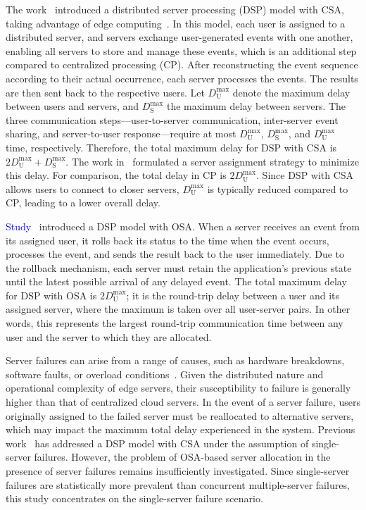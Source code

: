 \documentclass[10pt, letterpaper]{IEEEtran}
\newcommand\blue[1]{\textcolor{blue}{#1}}
\begin{document}
\begin{CJK}{UTF8}{ipxm}
The work~\cite{2Kawabata2017} introduced a distributed server processing (DSP) model with CSA, taking advantage of edge computing~\cite{edge_26,edge_27,edge_28,edge_29}. 
In this model, each user is assigned to a distributed server, and servers exchange user-generated events with one another, enabling all servers to store and manage these events, which is an additional step compared to centralized processing (CP). 
After reconstructing the event sequence according to their actual occurrence, each server processes the events.
The results are then sent back to the respective users. 
Let $D_\mathrm{U}^{\max}$ denote the maximum delay between users and servers, and $D_\mathrm{S}^{\max}$ the maximum delay between servers. 
The three communication steps—user-to-server communication, inter-server event sharing, and server-to-user response—require at most $D_\mathrm{U}^{\max}$, $D_\mathrm{S}^{\max}$, and $D_\mathrm{U}^{\max}$ time, respectively. 
Therefore, the total maximum delay for DSP with CSA is $2D_\mathrm{U}^{\max} + D_\mathrm{S}^{\max}$. 
The work in~\cite{2Kawabata2017} formulated a server assignment strategy to minimize this delay. 
For comparison, the total delay in CP is $2D_\mathrm{U}^{\max}$. 
Since DSP with CSA allows users to connect to closer servers, $D_\mathrm{U}^{\max}$ is typically reduced compared to CP, leading to a lower overall delay.

\blue{Study~\cite{OSA_Kawabata_2021,OSA_Kawabata_13_Kawabata2020}} introduced a DSP model with OSA.
When a server receives an event from its assigned user, it rolls back its status to the time when the event occurs, processes the event, and sends the result back to the user immediately.
Due to the rollback mechanism, each server must retain the application's previous state until the latest possible arrival of any delayed event.
The total maximum delay for DSP with OSA is $2D_\mathrm{U}^{\max}$;
it is the round-trip delay between a user and its assigned server, where the maximum is taken over all user-server pairs. 
In other words, this represents the largest round-trip communication time between any user and the server to which they are allocated.

Server failures can arise from a range of causes, such as hardware breakdowns, software faults, or overload conditions~\cite{5_9_8_Shi2016}. 
Given the distributed nature and operational complexity of edge servers, their susceptibility to failure is generally higher than that of centralized cloud servers.
In the event of a server failure, users originally assigned to the failed server must be reallocated to alternative servers, which may impact the maximum total delay experienced in the system.
Previous work~\cite{5_9_Masuda2020} has addressed a DSP model with CSA under the assumption of single-server failures.
However, the problem of OSA-based server allocation in the presence of server failures remains insufficiently investigated.
Since single-server failures are statistically more prevalent than concurrent multiple-server failures, this study concentrates on the single-server failure scenario.


\end{CJK}
\end{document}
